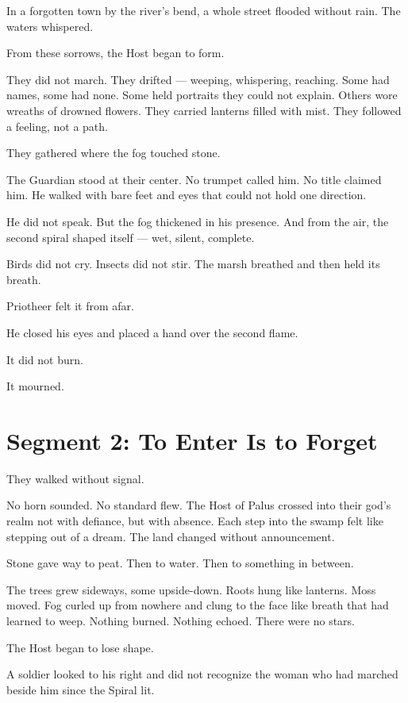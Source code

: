 \documentclass[9pt]{article}
\begin{document}
In a forgotten town by the river’s bend, a whole street flooded without rain. The waters whispered.

From these sorrows, the Host began to form.

They did not march. They drifted — weeping, whispering, reaching. Some had names, some had none. Some held portraits they could not explain. Others wore wreaths of drowned flowers. They carried lanterns filled with mist. They followed a feeling, not a path.

They gathered where the fog touched stone.

The Guardian stood at their center. No trumpet called him. No title claimed him. He walked with bare feet and eyes that could not hold one direction.

He did not speak. But the fog thickened in his presence. And from the air, the second spiral shaped itself — wet, silent, complete.

Birds did not cry. Insects did not stir. The marsh breathed and then held its breath.

Priotheer felt it from afar.

He closed his eyes and placed a hand over the second flame.

It did not burn.

It mourned.

\newpage

\section*{Segment 2: To Enter Is to Forget}

They walked without signal.

No horn sounded. No standard flew. The Host of Palus crossed into their god’s realm not with defiance, but with absence. Each step into the swamp felt like stepping out of a dream. The land changed without announcement.

Stone gave way to peat. Then to water. Then to something in between.

The trees grew sideways, some upside-down. Roots hung like lanterns. Moss moved. Fog curled up from nowhere and clung to the face like breath that had learned to weep. Nothing burned. Nothing echoed. There were no stars.

The Host began to lose shape.

A soldier looked to his right and did not recognize the woman who had marched beside him since the Spiral lit.
\end{document}
